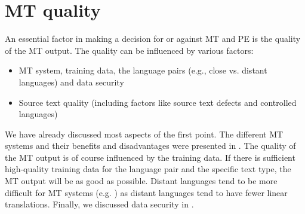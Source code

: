 \section{MT quality}\label{sec:8:2}

An essential factor in making a decision for or against MT and PE is the quality of the MT output. The quality can be influenced by various factors:

\begin{itemize}
    \item MT system, training data, the language pairs (e.g., close vs. distant languages) and data security
    \item Source text quality (including factors like source text defects and controlled languages)
\end{itemize}

We have already discussed most aspects of the first point. The different MT systems and their benefits and disadvantages were presented in . The quality of the MT output is of course influenced by the training data. If there is sufficient high-quality training data for the language pair and the specific text type, the MT output will be as good as possible. Distant languages tend to be more difficult for MT systems (e.g. \citealt{alam2013manual}) as distant languages tend to have fewer linear translations. Finally, we discussed data security in .

